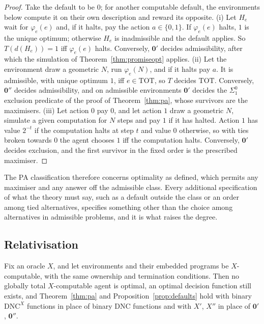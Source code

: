 \begin{proof}
Take the default to be $0$; for another computable default, the environments below compute it on their
own description and reward its opposite. (i) Let $H_e$ wait for $\varphi_e(e)$ and, if it halts, pay
the action $a\in\{0,1\}$. If $\varphi_e(e)$ halts, $1$ is the unique optimum; otherwise $H_e$ is
inadmissible and the default applies. So $T(d(H_e))=1$ iff $\varphi_e(e)$ halts. Conversely,
$\mathbf 0'$ decides admissibility, after which the simulation of Theorem~\ref{thm:promiseopt}
applies. (ii) Let the environment draw a geometric $N$, run $\varphi_e(N)$, and if it halts pay $a$. It
is admissible, with unique optimum $1$, iff $e\in\mathrm{TOT}$, so $T$ decides $\mathrm{TOT}$.
Conversely, $\mathbf 0''$ decides admissibility, and on admissible environments $\mathbf 0'$ decides
the $\Sigma^0_1$ exclusion predicate of the proof of Theorem~\ref{thm:pa}, whose survivors are the
maximisers. (iii) Let action $0$ pay $0$, and let action $1$ draw a geometric $N$, simulate a given
computation for $N$ steps and pay $1$ if it has halted. Action $1$ has value $2^{-t}$ if the
computation halts at step $t$ and value $0$ otherwise, so with ties broken towards $0$ the agent
chooses $1$ iff the computation halts. Conversely, $\mathbf 0'$ decides exclusion, and the first
survivor in the fixed order is the prescribed maximiser.
\end{proof}

The PA classification therefore concerns optimality as defined, which permits any maximiser and any
answer off the admissible class. Every additional specification of what the theory must say, such as
a default outside the class or an order among tied alternatives, specifies something other than the
choice among alternatives in admissible problems, and it is what raises the degree.

\subsection{Relativisation}

\begin{theorem}\label{thm:reldiag}
Fix an oracle $X$, and let environments and their embedded programs be $X$-computable, with the same
ownership and termination conditions. Then no globally total $X$-computable agent is optimal, an
optimal decision function still exists, and Theorem~\ref{thm:pa} and Proposition~\ref{prop:defaults}
hold with binary $\mathrm{DNC}^X$ functions in place of binary DNC functions and with $X'$, $X''$ in
place of $\mathbf 0'$, $\mathbf 0''$.
\end{theorem}

